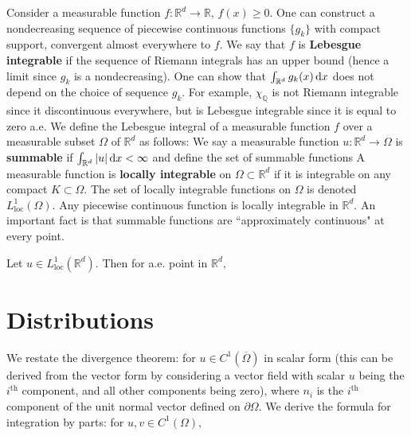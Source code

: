 Consider a measurable function $f:\mathbb{R}^d\rightarrow\mathbb{R},\,f(x)\geq0.$ One can construct a nondecreasing sequence of piecewise continuous functions $\{g_k\}$ with compact support, convergent almost everywhere to $f.$ We say that $f$ is \textbf{Lebesgue integrable} if the sequence of Riemann integrals
has an upper bound (hence a limit since $g_k$ is a nondecreasing). One can show that $\int_{\mathbb{R}^d}g_k(x)\,\mathrm{d} x$ does not depend on the choice of sequence $g_k.$
For example, $\chi_{\mathbb{Q}}$ is not Riemann integrable since it discontinuous everywhere, but is Lebesgue integrable since it is equal to zero a.e. We define the Lebesgue integral of a measurable function $f$ over a measurable subset $\Omega$ of $\mathbb{R}^d$ as follows:
We say a measurable function $u:\mathbb{R}^d\rightarrow\Omega$ is \textbf{summable} if $\int_{\mathbb{R}^d}\abs{u}\,\mathrm{d} x < \infty$ and define the set of summable functions
A measurable function is \textbf{locally integrable} on $\Omega\subset\mathbb{R}^d$ if it is integrable on any compact $K\subset\Omega.$ The set of locally integrable functions on $\Omega$ is denoted $L^1_\mathrm{loc}(\Omega).$
Any piecewise continuous function is locally integrable in $\mathbb{R}^d.$ An important fact is that summable functions are ``approximately continuous" at every point.
\begin{theorem}
    Let $u\in L^1_\mathrm{loc}(\mathbb{R}^d).$ Then for a.e. point in $\mathbb{R}^d,$
\end{theorem}
\section{Distributions}
We restate the divergence theorem: for $u\in C^1(\overline{\Omega})$ in scalar form (this can be derived from the vector form by considering a vector field with scalar $u$ being the $i^\text{th}$ component, and all other components being zero),
where $n_i$ is the $i^\text{th}$ component of the unit normal vector defined on $\partial\Omega.$ We derive the formula for integration by parts: for $u,v\in C^1(\Omega),$

